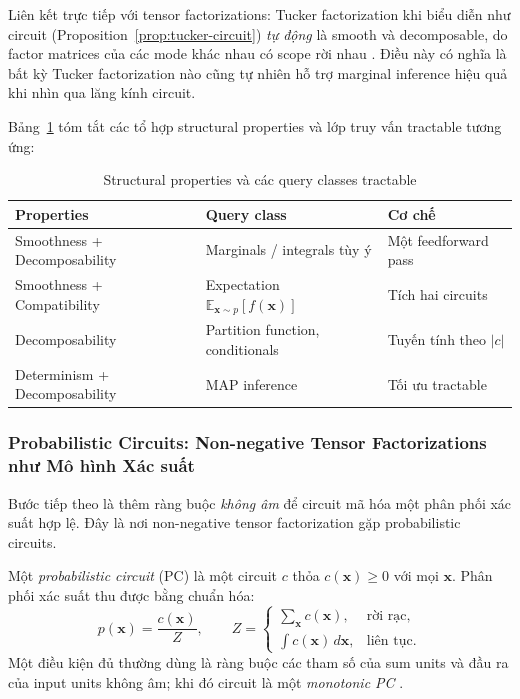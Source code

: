 Liên kết trực tiếp với tensor factorizations: Tucker factorization khi biểu diễn
như circuit (Proposition~\ref{prop:tucker-circuit}) \emph{tự động} là smooth và
decomposable, do factor matrices của các mode khác nhau có scope rời nhau
\cite{loconte2025relationship}.  Điều này có nghĩa là bất kỳ Tucker factorization
nào cũng tự nhiên hỗ trợ marginal inference hiệu quả khi nhìn qua lăng kính circuit.

Bảng~\ref{tab:properties} tóm tắt các tổ hợp structural properties và lớp truy vấn
tractable tương ứng:

\begin{table}[h]
\centering
\caption{Structural properties và các query classes tractable
         \cite{chrysos2025foundationsTutorial, vergari2021compositional}}
\label{tab:properties}
\begin{tabular}{lll}
\toprule
\textbf{Properties} & \textbf{Query class} & \textbf{Cơ chế} \\
\midrule
Smoothness + Decomposability & Marginals / integrals tùy ý & Một feedforward pass \\
Smoothness + Compatibility   & Expectation $\mathbb{E}_{\mathbf{x} \sim p}[f(\mathbf{x})]$ & Tích hai circuits \\
Decomposability              & Partition function, conditionals & Tuyến tính theo $|c|$ \\
Determinism + Decomposability & MAP inference & Tối ưu tractable \\
\bottomrule
\end{tabular}
\end{table}

\subsubsection{Probabilistic Circuits: Non-negative Tensor Factorizations như Mô hình Xác suất}

Bước tiếp theo là thêm ràng buộc \emph{không âm} để circuit mã hóa một phân phối
xác suất hợp lệ.  Đây là nơi non-negative tensor factorization gặp probabilistic
circuits.

\begin{definition}
\label{def:pc}
Một \emph{probabilistic circuit} (PC) là một circuit $c$ thỏa
$c(\mathbf{x}) \geq 0$ với mọi $\mathbf{x}$.  Phân phối xác suất thu được bằng
chuẩn hóa:
\begin{equation}
    p(\mathbf{x}) = \frac{c(\mathbf{x})}{Z},
    \qquad
    Z =
    \begin{cases}
        \displaystyle\sum_{\mathbf{x}} c(\mathbf{x}), & \text{rời rạc},\\[4pt]
        \displaystyle\int c(\mathbf{x})\, d\mathbf{x}, & \text{liên tục}.
    \end{cases}
    \label{eq:pc-normalize}
\end{equation}
Một điều kiện đủ thường dùng là ràng buộc các tham số của sum units và đầu ra của
input units không âm; khi đó circuit là một \emph{monotonic PC}
\cite{loconte2025relationship}.
\end{definition}

